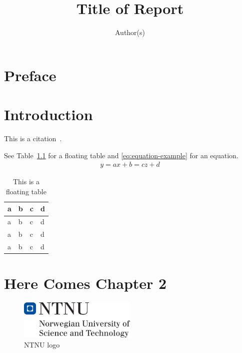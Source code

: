 \documentclass{tpk4170report}
\title{Title of Report}
\author{Author(s)}
\begin{document}
\maketitle

\frontmatter

\chapter*{Preface}

\tableofcontents
\listoffigures
\listoftables

\mainmatter








\chapter{Introduction}
\label{chap:Introduction}

\blindmathtrue
\blindtext

This is a citation~\cite{McCarthy2011}. \blindtext

See Table~\ref{table:floating-table} for a floating table and
\eqref{eq:equation-example} for an equation.
\begin{align}
  \label{eq:equation-example}
  y = ax + b 
    = cz + d 
\end{align}

\begin{table}
  \centering
  \begin{tabular}{l|lll}
    a& b& c &d \\
    \hline
    a& b& c &d \\
    a& b& c &d \\
    a& b& c &d
  \end{tabular}
  \caption{This is a floating table}
  \label{table:floating-table}
\end{table}











\chapter{Here Comes Chapter 2}

\Blindtext

\begin{figure}
  \centering
  \includegraphics[width=0.5\textwidth]{hovedlogo} 
  \caption{NTNU logo}
  \label{fig:logo2}
\end{figure}
\end{document}

